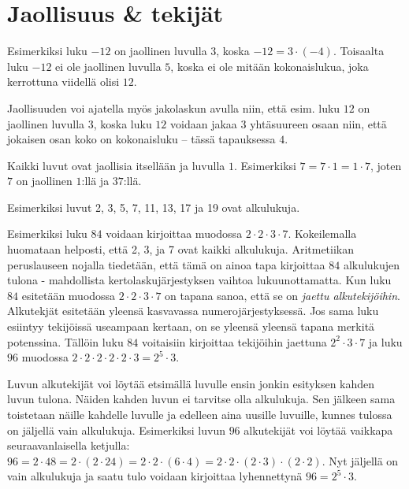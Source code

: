 \chapter{Jaollisuus \& tekijät}


Esimerkiksi luku $-12$ on jaollinen luvulla $3$, koska $-12=3\cdot (-4)$. Toisaalta luku $-12$ ei ole jaollinen luvulla $5$, koska ei ole mitään kokonaislukua, joka kerrottuna viidellä olisi $12$.

Jaollisuuden voi ajatella myös jakolaskun avulla niin, että esim. luku $12$ on jaollinen luvulla $3$, koska luku $12$ voidaan jakaa $3$ yhtäsuureen osaan niin, että jokaisen osan koko on kokonaisluku -- tässä tapauksessa $4$.

Kaikki luvut ovat jaollisia itsellään ja luvulla $1$. Esimerkiksi $7=7 \cdot 1=1 \cdot 7$, joten $7$ on jaollinen $1$:llä ja $37$:llä.


Esimerkiksi luvut 2, 3, 5, 7, 11, 13, 17 ja 19 ovat alkulukuja. 


Esimerkiksi luku $84$ voidaan kirjoittaa muodossa $2\cdot 2\cdot 3\cdot 7$. Kokeilemalla huomataan helposti, että 2, 3, ja 7 ovat kaikki alkulukuja. Aritmetiikan peruslauseen nojalla tiedetään, että tämä on ainoa tapa kirjoittaa $84$ alkulukujen tulona - mahdollista kertolaskujärjestyksen vaihtoa lukuunottamatta. Kun luku $84$ esitetään muodossa $2\cdot 2\cdot 3\cdot 7$ on tapana sanoa, että se on \emph{jaettu alkutekijöihin}. Alkutekjät esitetään yleensä kasvavassa numerojärjestyksessä. Jos sama luku esiintyy tekijöissä useampaan kertaan, on se yleensä yleensä tapana merkitä potenssina. Tällöin luku $84$ voitaisiin kirjoittaa tekijöihin jaettuna $2^2\cdot 3\cdot 7$ ja luku $96$ muodossa $2\cdot 2\cdot 2\cdot 2\cdot 2\cdot 3=2^5\cdot 3$.

Luvun alkutekijät voi löytää etsimällä luvulle ensin jonkin esityksen kahden luvun tulona. Näiden kahden luvun ei tarvitse olla alkulukuja. Sen jälkeen sama toistetaan näille kahdelle luvulle ja edelleen aina uusille luvuille, kunnes tulossa on jäljellä vain alkulukuja. Esimerkiksi luvun $96$ alkutekijät voi löytää vaikkapa seuraavanlaisella ketjulla: $96 = 2 \cdot 48 = 2 \cdot (2 \cdot 24) = 2 \cdot 2 \cdot (6 \cdot 4) = 2 \cdot 2 \cdot (2 \cdot 3) \cdot (2 \cdot 2)$. Nyt jäljellä on vain alkulukuja ja saatu tulo voidaan kirjoittaa lyhennettynä $96 = 2^5 \cdot 3$.


